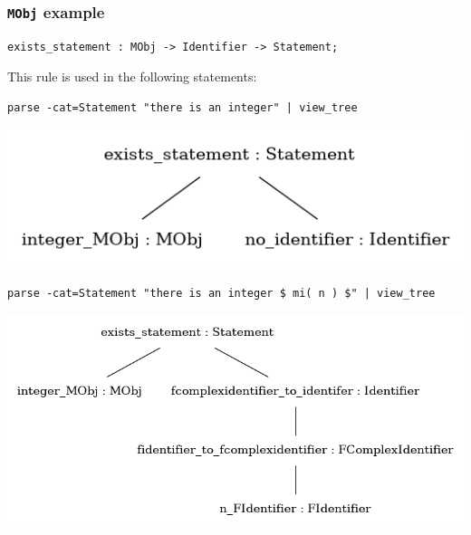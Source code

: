 \documentclass{beamer}
\begin{document}
\begin{frame}[fragile]
    \frametitle{\lstinline[language=GF]{MObj} example}
    \vspace{1em}
\begin{lstlisting}[language=GF, breaklines=true]
exists_statement : MObj -> Identifier -> Statement;
\end{lstlisting}

    \vspace{1em}
    This rule is used in the following statements:

    \vspace{1em}
\begin{lstlisting}[language=GFcmd, breaklines=true]
parse -cat=Statement "there is an integer" | view_tree
\end{lstlisting}
    \includegraphics[scale=0.3]{exists_noid.png}
\begin{lstlisting}[language=GFcmd, breaklines=true]
parse -cat=Statement "there is an integer $ mi( n ) $" | view_tree
\end{lstlisting}
    \includegraphics[scale=0.3]{exists_n.png}
\end{frame}
\end{document}
